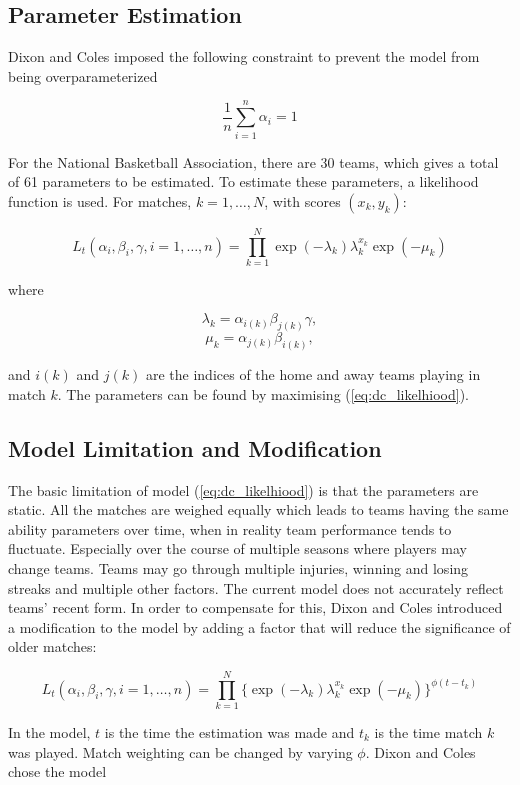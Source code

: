 \subsection{Parameter Estimation}
Dixon and Coles imposed the following constraint to prevent the model from being overparameterized

$$\frac{1}{n}\sum_{i=1}^{n}\alpha_i = 1$$

For the National Basketball Association, there are 30 teams, which gives a total of 61 parameters to be estimated.  To estimate these parameters, a likelihood function is used.  For matches, $k=1,\ldots,N$, with scores $(x_k, y_k)$:

\begin{equation}\label{eq:dc_likelhiood}
L_t(\alpha_i, \beta_i,\gamma,i=1,\ldots,n) = \prod_{k=1}^{N} \exp(-\lambda_k)\lambda_{k}^{x_k}\exp(-\mu_k)
\end{equation}

where

$$\lambda_k = \alpha_{i(k)}\beta_{j(k)}\gamma,$$
$$\mu_k = \alpha_{j(k)}\beta_{i(k)},$$

and $i(k)$ and $j(k)$ are the indices of the home and away teams playing in match $k$.  The parameters can be found by maximising (\ref{eq:dc_likelhiood}).

\subsection{Model Limitation and Modification}
The basic limitation of model (\ref{eq:dc_likelhiood}) is that the parameters are static.  All the matches are weighed equally which leads to teams having the same ability parameters over time, when in reality team performance tends to fluctuate.  Especially over the course of multiple seasons where players may change teams.  Teams may go through multiple injuries, winning and losing streaks and multiple other factors.  The current model does not accurately reflect teams' recent form.  In order to compensate for this, Dixon and Coles introduced a modification to the model by adding a factor that will reduce the significance of older matches:

\begin{equation}\label{eq:dc_time}
L_t(\alpha_i, \beta_i,\gamma,i=1,\ldots,n) = \prod_{k=1}^{N} \{\exp(-\lambda_k)\lambda_{k}^{x_k}\exp(-\mu_k)\}^{\phi(t-t_k)}
\end{equation}

In the model, $t$ is the time the estimation was made and $t_k$ is the time match $k$ was played.  Match weighting can be changed by varying $\phi$.  Dixon and Coles chose the model

